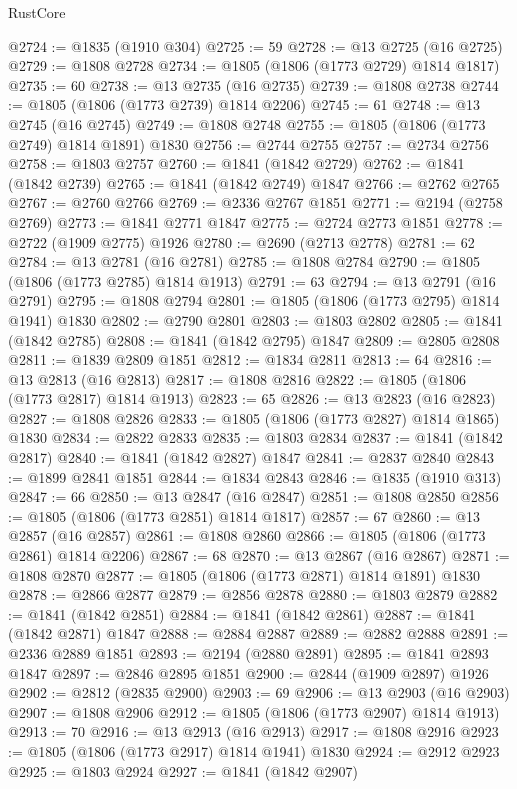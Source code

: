 \begin{lexlean}{RustCore}
\begin{coremodule}
@2724 := @1835 (@1910 @304)
@2725 := 59
@2728 := @13 @2725 (@16 @2725)
@2729 := @1808 @2728
@2734 := @1805 (@1806 (@1773 @2729) @1814 @1817)
@2735 := 60
@2738 := @13 @2735 (@16 @2735)
@2739 := @1808 @2738
@2744 := @1805 (@1806 (@1773 @2739) @1814 @2206)
@2745 := 61
@2748 := @13 @2745 (@16 @2745)
@2749 := @1808 @2748
@2755 := @1805 (@1806 (@1773 @2749) @1814 @1891) @1830
@2756 := @2744 @2755
@2757 := @2734 @2756
@2758 := @1803 @2757
@2760 := @1841 (@1842 @2729)
@2762 := @1841 (@1842 @2739)
@2765 := @1841 (@1842 @2749) @1847
@2766 := @2762 @2765
@2767 := @2760 @2766
@2769 := @2336 @2767 @1851
@2771 := @2194 (@2758 @2769)
@2773 := @1841 @2771 @1847
@2775 := @2724 @2773 @1851
@2778 := @2722 (@1909 @2775) @1926
@2780 := @2690 (@2713 @2778)
@2781 := 62
@2784 := @13 @2781 (@16 @2781)
@2785 := @1808 @2784
@2790 := @1805 (@1806 (@1773 @2785) @1814 @1913)
@2791 := 63
@2794 := @13 @2791 (@16 @2791)
@2795 := @1808 @2794
@2801 := @1805 (@1806 (@1773 @2795) @1814 @1941) @1830
@2802 := @2790 @2801
@2803 := @1803 @2802
@2805 := @1841 (@1842 @2785)
@2808 := @1841 (@1842 @2795) @1847
@2809 := @2805 @2808
@2811 := @1839 @2809 @1851
@2812 := @1834 @2811
@2813 := 64
@2816 := @13 @2813 (@16 @2813)
@2817 := @1808 @2816
@2822 := @1805 (@1806 (@1773 @2817) @1814 @1913)
@2823 := 65
@2826 := @13 @2823 (@16 @2823)
@2827 := @1808 @2826
@2833 := @1805 (@1806 (@1773 @2827) @1814 @1865) @1830
@2834 := @2822 @2833
@2835 := @1803 @2834
@2837 := @1841 (@1842 @2817)
@2840 := @1841 (@1842 @2827) @1847
@2841 := @2837 @2840
@2843 := @1899 @2841 @1851
@2844 := @1834 @2843
@2846 := @1835 (@1910 @313)
@2847 := 66
@2850 := @13 @2847 (@16 @2847)
@2851 := @1808 @2850
@2856 := @1805 (@1806 (@1773 @2851) @1814 @1817)
@2857 := 67
@2860 := @13 @2857 (@16 @2857)
@2861 := @1808 @2860
@2866 := @1805 (@1806 (@1773 @2861) @1814 @2206)
@2867 := 68
@2870 := @13 @2867 (@16 @2867)
@2871 := @1808 @2870
@2877 := @1805 (@1806 (@1773 @2871) @1814 @1891) @1830
@2878 := @2866 @2877
@2879 := @2856 @2878
@2880 := @1803 @2879
@2882 := @1841 (@1842 @2851)
@2884 := @1841 (@1842 @2861)
@2887 := @1841 (@1842 @2871) @1847
@2888 := @2884 @2887
@2889 := @2882 @2888
@2891 := @2336 @2889 @1851
@2893 := @2194 (@2880 @2891)
@2895 := @1841 @2893 @1847
@2897 := @2846 @2895 @1851
@2900 := @2844 (@1909 @2897) @1926
@2902 := @2812 (@2835 @2900)
@2903 := 69
@2906 := @13 @2903 (@16 @2903)
@2907 := @1808 @2906
@2912 := @1805 (@1806 (@1773 @2907) @1814 @1913)
@2913 := 70
@2916 := @13 @2913 (@16 @2913)
@2917 := @1808 @2916
@2923 := @1805 (@1806 (@1773 @2917) @1814 @1941) @1830
@2924 := @2912 @2923
@2925 := @1803 @2924
@2927 := @1841 (@1842 @2907)

\end{coremodule}
\end{lexlean}
